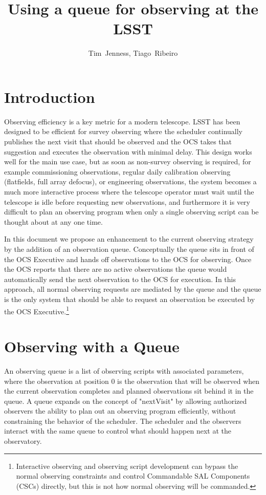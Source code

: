 \documentclass[TS,toc,lsstdraft]{lsstdoc}
\title{Using a queue for observing at the LSST}
\author         {Tim~Jenness, Tiago~Ribeiro}                %
\begin{document}
%
%
\maketitle


\section{Introduction}

Observing efficiency is a key metric for a modern telescope.
LSST has been designed to be efficient for survey observing where the scheduler continually publishes the next visit that should be observed and the OCS takes that suggestion and executes the observation with minimal delay.
This design works well for the main use case, but as soon as non-survey observing is required, for example commissioning observations, regular daily calibration observing (flatfields, full array defocus), or engineering observations, the system becomes a much more interactive process where the telescope operator must wait until the telescope is idle before requesting new observations, and furthermore it is very difficult to plan an observing program when only a single observing script can be thought about at any one time.

In this document we propose an enhancement to the current observing strategy by the addition of an observation queue.
Conceptually the queue sits in front of the OCS Executive and hands off observations to the OCS for observing.
Once the OCS reports that there are no active observations the queue would automatically send the next observation to the OCS for execution.
In this approach, all normal observing requests are mediated by the queue and the queue is the only system that should be able to request an observation be executed by the OCS Executive.\footnote{Interactive observing and observing script development can bypass the normal observing constraints and control Commandable SAL Components (CSCs) directly, but this is not how normal observing will be commanded.}


\section{Observing with a Queue}

An observing queue is a list of observing scripts with associated parameters, where the observation at position 0 is the observation that will be observed when the current observation completes and planned observations sit behind it in the queue.
A queue expands on the concept of "nextVisit" by allowing authorized observers the ability to plan out an observing program efficiently, without constraining the behavior of the scheduler.
The scheduler and the observers interact with the same queue to control what should happen next at the observatory.
\end{document}
